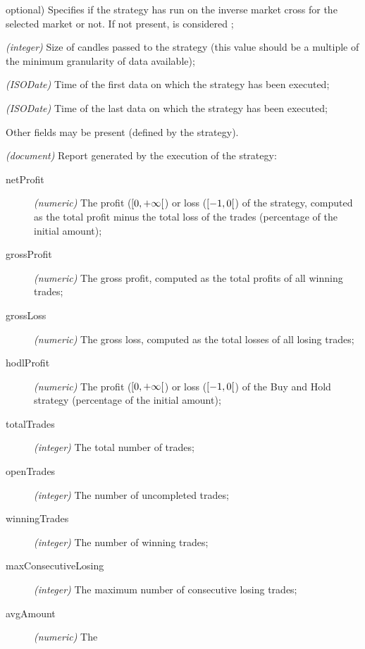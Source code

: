 \begin{description}
\begin{description}
\begin{description}[font=\textit]
{						optional)} Specifies if the
						strategy has run on the inverse
						market cross for the selected
						market or not. If not present,
						is considered ;
					\item[granularity] \textit{(integer)}
						Size of candles passed to the
						strategy (this value should be a
						multiple of the minimum
						granularity of data available);
					\item[startTime]
						\textit{(ISODate)} Time of the
						first data on which the strategy
						has been executed;
					\item[endTime]
						\textit{(ISODate)} Time of the
						last data on which the strategy
						has been executed;
					\item[\ldots] Other fields may be
						present (defined by the
						strategy).
				\end{description}
			\item[report] \textit{(document)} Report generated by
				the execution of the strategy:
				\begin{description}
					\item[netProfit] \textit{(numeric)} The
						profit (\(\interval[open
						right]{0}{+\infty}\)) or loss
						(\(\interval[open
						right]{-1}{0}\)) of the
						strategy, computed as the total
						profit minus the total loss of
						the trades (percentage of the
						initial amount);
					\item[grossProfit] \textit{(numeric)}
						The gross profit, computed as
						the total profits of all winning
						trades;
					\item[grossLoss] \textit{(numeric)} The
						gross loss, computed as the
						total losses of all losing
						trades;
					\item[hodlProfit] \textit{(numeric)} The
						profit (\(\interval[open
						right]{0}{+\infty}\)) or loss
						(\(\interval[open
						right]{-1}{0}\)) of the Buy and
						Hold strategy (percentage of the
						initial amount);
					\item[totalTrades] \textit{(integer)}
						The total number of trades;
					\item[openTrades] \textit{(integer)} The
						number of uncompleted trades;
					\item[winningTrades] \textit{(integer)}
						The number of winning trades;
					\item[maxConsecutiveLosing]
						\textit{(integer)} The maximum
						number of consecutive losing
						trades;
					\item[avgAmount] \textit{(numeric)} The

\end{description}
\end{description}
\end{description}
